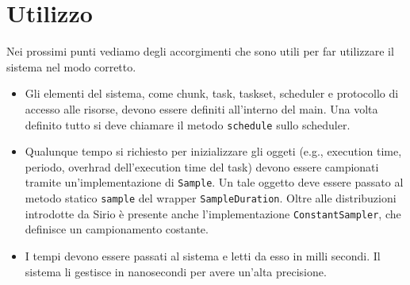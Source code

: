 \section{Utilizzo}
Nei prossimi punti vediamo degli accorgimenti che sono utili per far utilizzare il sistema nel modo corretto.
\begin{itemize}
    \item Gli elementi del sistema, come chunk, task, taskset, scheduler e protocollo di accesso alle risorse, devono essere definiti all'interno del main. Una volta definito tutto si deve chiamare il metodo \texttt{schedule} sullo scheduler.
    \item Qualunque tempo si richiesto per inizializzare gli oggeti (e.g., execution time, periodo, overhrad dell'execution time del task) devono essere campionati tramite un'implementazione di \texttt{Sample}. Un tale oggetto deve essere passato al metodo statico \texttt{sample} del wrapper \texttt{SampleDuration}. Oltre alle distribuzioni introdotte da Sirio è presente anche l'implementazione \texttt{ConstantSampler}, che definisce un campionamento costante.
    \item I tempi devono essere passati al sistema e letti da esso in milli secondi. Il sistema li gestisce in nanosecondi per avere un'alta precisione.
\end{itemize}
